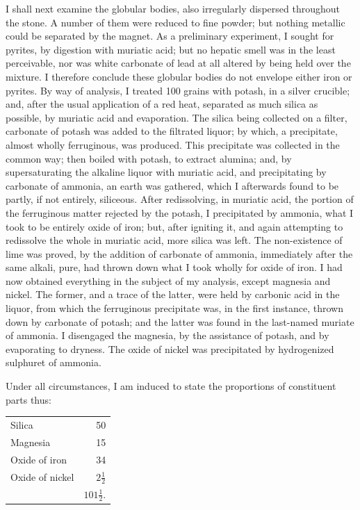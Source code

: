 \documentclass[a4paper, 12pt, oneside, twocolumn]{article}
\begin{document}
I shall next examine the globular bodies, also irregularly dispersed throughout the stone. A number of them were reduced to fine powder; but nothing metallic could be separated by the magnet. As a preliminary experiment, I sought for pyrites, by digestion with muriatic acid; but no hepatic smell was in the least perceivable, nor was white carbonate of lead at all altered by being held over the mixture. I therefore conclude these globular bodies do not envelope either iron or pyrites. By way of analysis, I treated 100 grains with potash, in a silver crucible; and, after the usual application of a red heat, separated as much silica as possible, by muriatic acid and evaporation. The silica being collected on a filter, carbonate of potash was added to the filtrated liquor; by which, a precipitate, almost wholly ferruginous, was produced. This precipitate was collected in the common way; then boiled with potash, to extract alumina; and, by supersaturating the alkaline liquor with muriatic acid, and precipitating by carbonate of ammonia, an earth was gathered, which I afterwards found to be partly, if not entirely, siliceous. After redissolving, in muriatic acid, the portion of the ferruginous matter rejected by the potash, I precipitated by ammonia, what I took to be entirely oxide of iron; but, after igniting it, and again attempting to redissolve the whole in muriatic acid, more silica was left. The non-existence of lime was proved, by the addition of carbonate of ammonia, immediately after the same alkali, pure, had thrown down what I took wholly for oxide of iron. I had now obtained everything in the subject of my analysis, except magnesia and nickel. The former, and a trace of the latter, were held by carbonic acid in the liquor, from which the ferruginous precipitate was, in the first instance, thrown down by carbonate of potash; and the latter was found in the last-named muriate of ammonia. I disengaged the magnesia, by the assistance of potash, and by evaporating to dryness. The oxide of nickel was precipitated by hydrogenized sulphuret of ammonia.

Under all circumstances, I am induced to state the proportions of constituent parts thus:
\begin{table}[H]
    \centering\bfseries
    \begin{tabular}{l r}
        Silica & 50 \\ 
        Magnesia & 15 \\ 
        Oxide of iron & 34 \\ 
        Oxide of nickel & $2\frac{1}{2}$   \\ \hline
        ~ & $101\frac{1}{2}$. \\
    \end{tabular}
\end{table}
\end{document}

